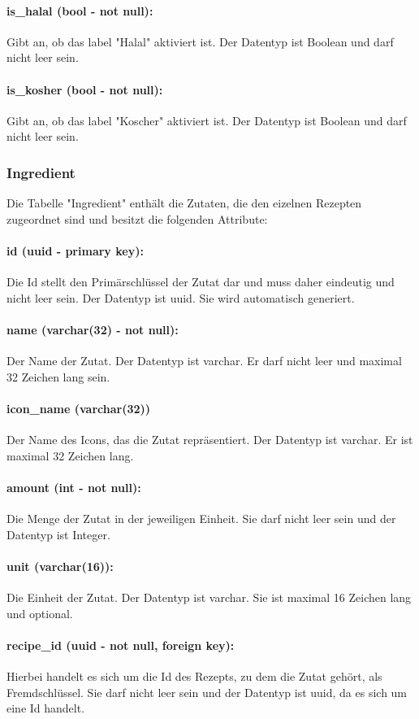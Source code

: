 \documentclass{entwurfsheft}
\begin{document}
\paragraph{is\_halal (bool - not null):} Gibt an, ob das \Gls{label} "Halal" aktiviert ist. Der Datentyp ist Boolean und darf nicht leer sein.
\paragraph{is\_kosher (bool - not null):} Gibt an, ob das \Gls{label} "Koscher" aktiviert ist. Der Datentyp ist Boolean und darf nicht leer sein.
\newpage
\subsubsection{Ingredient}
Die Tabelle "Ingredient" enthält die Zutaten, die den eizelnen Rezepten zugeordnet sind und besitzt die folgenden Attribute:
\paragraph{id (uuid - primary key):} Die Id stellt den Primärschlüssel der Zutat dar und muss daher eindeutig und nicht leer sein. Der Datentyp ist \Gls{uuid}. Sie wird automatisch generiert.
\paragraph{name (varchar(32) - not null):} Der Name der Zutat. Der Datentyp ist \Gls{varchar}. Er darf nicht leer und maximal 32 Zeichen lang sein.
\paragraph{icon\_name (varchar(32))} Der Name des Icons, das die Zutat repräsentiert. Der Datentyp ist \Gls{varchar}. Er ist maximal 32 Zeichen lang.
\paragraph{amount (int - not null):} Die Menge der Zutat in der jeweiligen Einheit. Sie darf nicht leer sein und der Datentyp ist Integer.
\paragraph{unit (varchar(16)):} Die Einheit der Zutat. Der Datentyp ist \Gls{varchar}. Sie ist maximal 16 Zeichen lang und optional.
\paragraph{recipe\_id (uuid - not null, foreign key):} Hierbei handelt es sich um die Id des Rezepts, zu dem die Zutat gehört, als Fremdschlüssel. Sie darf nicht leer sein und der Datentyp ist \Gls{uuid}, da es sich um eine Id handelt.
\newpage
\end{document}

